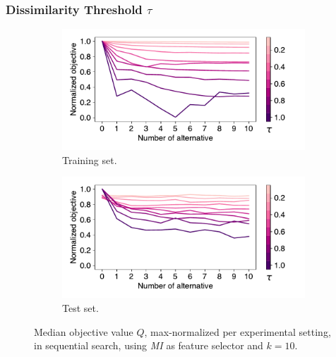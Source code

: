 \documentclass{article}
\theoremstyle{definition}
\begin{document}
\subsubsection{Dissimilarity Threshold \texorpdfstring{$\tau$}{}} %

\begin{figure}[htb]
	\centering
	\begin{subfigure}{0.48\textwidth}
		\centering
		\includegraphics[width=\textwidth, trim=5 15 30 10, clip]{plots/impact-num-alternatives-train-objective-tau.pdf}
		\caption{Training set.}
		\label{fig:impact-num-alternatives-train-objective-tau}
	\end{subfigure}
	\hfill
	\begin{subfigure}{0.48\textwidth}
		\centering
		\includegraphics[width=\textwidth, trim=5 15 30 10, clip]{plots/impact-num-alternatives-test-objective-tau.pdf}
		\caption{Test set.}
		\label{fig:impact-num-alternatives-test-objective-tau}
	\end{subfigure}
	\caption{Median objective value $Q$, max-normalized per experimental setting, in sequential search, using \emph{MI} as feature selector and $k=10$.}
	\label{fig:impact-num-alternatives-objective-tau}
\end{figure}
\end{document}
